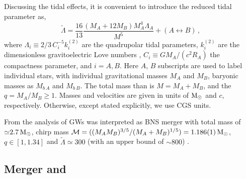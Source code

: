 Discussing the tidal effects, it is convenient to introduce the 
reduced tidal parameter \citep{Favata:2013rwa} as, 
%
\begin{equation}
\tilde\Lambda = \frac{16}{13}\frac{(M_A+12 M_B)M_A^4 \Lambda_A}{M^5}+(A\leftrightarrow B)\, ,
\label{eq:intro:Lambda}
\end{equation}
%
where $\Lambda_i \equiv 2/3\, C_i^{-5} k^{(2)}_i$ are the quadrupolar tidal parameters, 
$k_i^{(2)}$ are the dimensionless gravitoelectric Love numbers \citep{Damour:2009vw}, 
$C_i \equiv GM_A/(c^2R_A)$ the compactness parameter, and $i=A,B$.
%
Here $A$, $B$ subscripts are used to label individual stars, with 
individual gravitational masses $M_A$ and $M_B$, 
baryonic masses as $M_{b~A}$ and $M_{b~B}$.
The total mass than is $M = M_A + M_B$, and the \mr{} $q=M_A/M_B\geq1$. 
%
Masses and velocities are given in units of ${\text{M}_{\odot}}$ and $c$, respectively.
Otherwise, except stated explicitly, we use CGS units. 
%
%
%
%



From the analysis of \acp{GW} \GW{} was interpreted as \ac{BNS} merger with total mass of
${\simeq}2.7\,{\text{M}_{\odot}}$, chirp mass $\mathcal{M}=( (M_A M_B)^{3/5} / (M_A + M_B)^{1/5} ) = 1.186(1)\,{\text{M}_{\odot}}$, \mr{} $q\in[1,1.34]$ 
and $\tilde{\Lambda}\simeq300$ (with an upper bound of ${\sim}800$)
\citep{TheLIGOScientific:2017qsa,Abbott:2018wiz,LIGOScientific:2018mvr}.


\subsection{Merger and \pmerg{}}\label{sec:intro:merg_pmerg}

